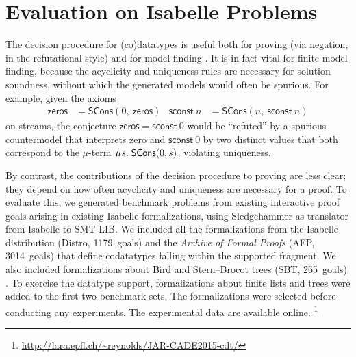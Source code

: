 \documentclass[smallcondensed,draft]{svjour3}
\newcommand\MU{\vvthinspace\mu\vvthinspace}
\newcommand\const[1]{\textsf{#1}}
\newcommand\vvthinspace{\kern+0.041667em}
\begin{document}
\section{Evaluation on Isabelle Problems}
\label{sec:evaluation-on-isabelle-problems}

\newcommand\gandl{SBT}
\newcommand\HD[1]{\hbox to2em{\footnotesize\hfill\!\!\!\!#1\!\!\!\!\hfill}}

The decision procedure for (co)datatypes is useful both for proving (via
negation, in the refutational style) and for model finding
\cite{reynolds-et-al-2013,ge-de-moura-2009}.
It is in fact vital for finite model finding,
because the acyclicity and uniqueness rules are necessary for solution
soundness, without which the generated models would often be
spurious. For example, given the axioms
\begin{align*}
\const{zeros} & = \const{SCons}(0,\:\const{zeros})
& \const{sconst}~n & = \const{SCons}(n,\:\const{sconst}~n)
\end{align*}
on streams, the conjecture
$\const{zeros} = \const{sconst}~0$
would be ``refuted'' by a spurious countermodel that interprets
\const{zero} and $\const{sconst}~0$ by two distinct
values that both correspond to the \hbox{$\mu$-term}
$\MU s.\; \const{SCons}(0, s)$,
violating uniqueness.

By contrast, the contributions of the decision procedure
to proving are less clear; they depend on how
often acyclicity and uniqueness are necessary for a proof.
To evaluate this,
we generated benchmark problems from existing interactive
proof goals arising in existing
Isabelle formalizations, using Sledgehammer \cite{blanchette-et-al-2013-smt}
as translator from Isabelle to SMT-LIB.
We
included all the formalizations from the Isabelle distribution (Distro, 1179~goals)
and the \emph{Archive of Formal Proofs} (AFP, 3014~goals) \cite{klein-et-al-afp}
that define codatatypes falling within the supported fragment. We
also included formalizations about Bird and Stern--Brocot trees (\gandl,
265~goals) \cite{gammie-lochbihler-2016}. To exercise the datatype support, formalizations about finite
lists and trees
were added to the first two benchmark sets. The formalizations were selected before
conducting any experiments. The experimental data are available
online.%
\footnote{\url{http://lara.epfl.ch/~reynolds/JAR-CADE2015-cdt/}}
\end{document}
